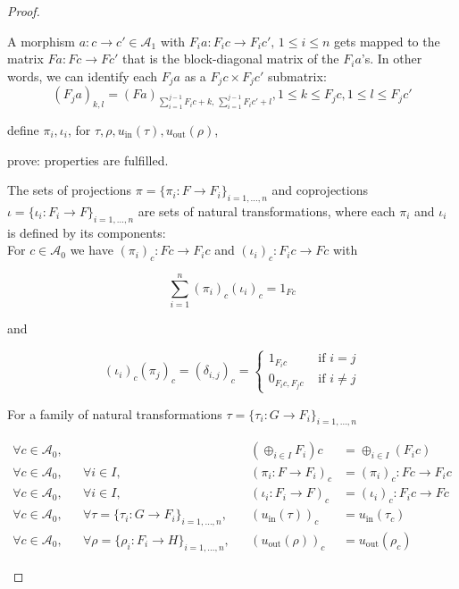 \begin{proof}
\begin{enumerate}
\begin{subproof}[Proof of (ii)]
A morphism $a : c \rightarrow c' \in \mathcal{A}_{1}$ with $F_{i} a : F_{i} c \rightarrow F_{i} c', \, 1\leq i\leq n$ gets mapped to the matrix 
$F a : Fc \rightarrow Fc'$ that is the block-diagonal matrix of the $F_{i}a$'s.
In other words, we can identify each $F_{j}a$ as a $F_{j} c \times F_{j} c'$ submatrix:
\[
\left(F_{j}a\right)_{k,l} = \left(F a\right)_{\sum_{i=1}^{j-1} F_{i}c + k,\,\sum_{i=1}^{j-1} F_{i}c' + l},
1 \leq k \leq F_{j}c, 1 \leq l \leq F_{j}c'
\]

define $\pi_{i}, \iota_{i}$, for $\tau, \rho, u_{\mathrm{in}}(\tau), u_{\mathrm{out}}(\rho)$,

prove:
properties are fulfilled.

The sets of projections $\pi = \{ \pi_{i} : F \rightarrow F_{i} \}_{i = 1,\dots,n}$ and coprojections
$\iota = \{ \iota_{i} : F_{i} \rightarrow F \}_{i = 1,\dots,n}$ are sets of natural transformations,
where each $\pi_{i}$ and $\iota_{i}$ is defined by its components:\\
For $c \in \mathcal{A}_{0}$ we have $(\pi_{i})_{c} : Fc \rightarrow F_{i}c$ and $(\iota_{i})_{c} : F_{i}c \rightarrow Fc$ with\\
\begin{minipage}{.35\textwidth}
\[
\sum_{i=1}^{n} (\pi_{i})_{c} (\iota_{i})_{c} = 1_{Fc}
\]
\end{minipage}
\begin{minipage}{.1\textwidth}
and
\end{minipage}
\begin{minipage}{.55\textwidth}
\[
(\iota_{i})_{c}(\pi_{j})_{c} = (\delta_{i,j})_{c} = \begin{cases}
1_{F_{i}c} & \text{ if } i = j \\
0_{F_{i}c, F_{j}c} & \text{ if } i \neq j
\end{cases}
\]
\end{minipage}

For a family of natural transformations $\tau = \{ \tau_{i} : G \rightarrow F_{i} \}_{i = 1,\dots,n}$

\begin{align*}
\forall c \in \mathcal{A}_{0},&& &&  (\oplus_{i \in I} F_{i}) c &= \oplus_{i \in I} (F_{i} c) \\
\forall c \in \mathcal{A}_{0},&& \forall i \in I,&& (\pi_{i} : F \rightarrow F_{i})_{c} &= (\pi_{i})_{c} : Fc \rightarrow F_{i} c \\
\forall c \in \mathcal{A}_{0},&& \forall i \in I,&& (\iota_{i} : F_{i} \rightarrow F)_{c} &= (\iota_{i})_{c} : F_{i} c \rightarrow Fc \\
\forall c \in \mathcal{A}_{0},&& \forall \tau = \{ \tau_{i} : G \rightarrow F_{i} \}_{i = 1,\dots,n},&&
(u_{\mathrm{in}}(\tau))_{c} &= u_{\mathrm{in}}(\tau_{c}) \\
\forall c \in \mathcal{A}_{0},&& \forall \rho = \{ \rho_{i} : F_{i} \rightarrow H \}_{i = 1,\dots,n},&&
(u_{\mathrm{out}}(\rho))_{c} &= u_{\mathrm{out}}(\rho_{c})
\end{align*}


\end{subproof}
\end{enumerate}
\end{proof}
